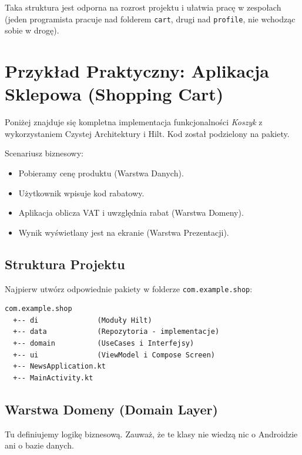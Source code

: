 Taka struktura jest odporna na rozrost projektu i ułatwia pracę w zespołach (jeden programista pracuje nad folderem \texttt{cart}, drugi nad \texttt{profile}, nie wchodząc sobie w drogę).

\section{Przykład Praktyczny: Aplikacja Sklepowa (Shopping Cart)}

Poniżej znajduje się kompletna implementacja funkcjonalności \textit{Koszyk} z wykorzystaniem Czystej Architektury i Hilt. Kod został podzielony na pakiety.

Scenariusz biznesowy:
\begin{itemize}
    \item Pobieramy cenę produktu (Warstwa Danych).
    \item Użytkownik wpisuje kod rabatowy.
    \item Aplikacja oblicza VAT i uwzględnia rabat (Warstwa Domeny).
    \item Wynik wyświetlany jest na ekranie (Warstwa Prezentacji).
\end{itemize}

\subsection{Struktura Projektu}

Najpierw utwórz odpowiednie pakiety w folderze \texttt{com.example.shop}:

\begin{verbatim}
com.example.shop
  +-- di              (Moduły Hilt)
  +-- data            (Repozytoria - implementacje)
  +-- domain          (UseCases i Interfejsy)
  +-- ui              (ViewModel i Compose Screen)
  +-- NewsApplication.kt
  +-- MainActivity.kt
\end{verbatim}

\subsection{Warstwa Domeny (Domain Layer)}

Tu definiujemy logikę biznesową. Zauważ, że te klasy nie wiedzą nic o Androidzie ani o bazie danych.

